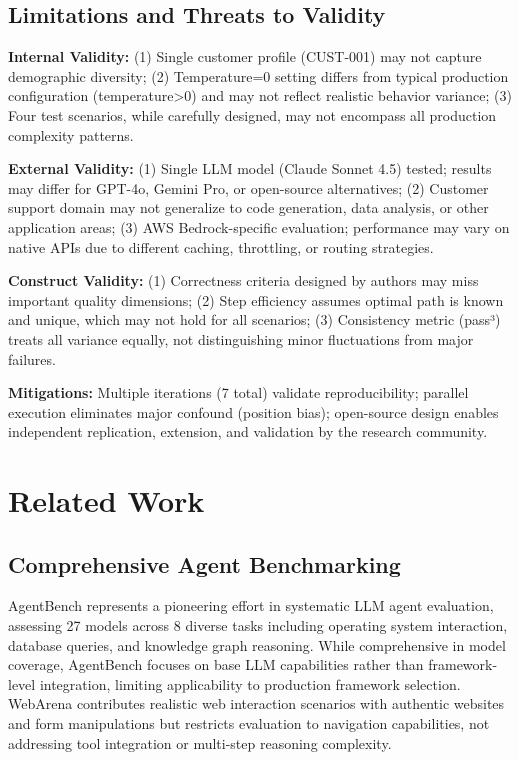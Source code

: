 \documentclass[sigconf,nonacm]{acmart}
\begin{document}
\subsection{Limitations and Threats to Validity}

\textbf{Internal Validity:} (1) Single customer profile (CUST-001) may not capture demographic diversity; (2) Temperature=0 setting differs from typical production configuration (temperature>0) and may not reflect realistic behavior variance; (3) Four test scenarios, while carefully designed, may not encompass all production complexity patterns.

\textbf{External Validity:} (1) Single LLM model (Claude Sonnet 4.5) tested; results may differ for GPT-4o, Gemini Pro, or open-source alternatives; (2) Customer support domain may not generalize to code generation, data analysis, or other application areas; (3) AWS Bedrock-specific evaluation; performance may vary on native APIs due to different caching, throttling, or routing strategies.

\textbf{Construct Validity:} (1) Correctness criteria designed by authors may miss important quality dimensions; (2) Step efficiency assumes optimal path is known and unique, which may not hold for all scenarios; (3) Consistency metric (pass³) treats all variance equally, not distinguishing minor fluctuations from major failures.

\textbf{Mitigations:} Multiple iterations (7 total) validate reproducibility; parallel execution eliminates major confound (position bias); open-source design enables independent replication, extension, and validation by the research community.

\section{Related Work}

\subsection{Comprehensive Agent Benchmarking}

AgentBench \cite{liu2023agentbench} represents a pioneering effort in systematic LLM agent evaluation, assessing 27 models across 8 diverse tasks including operating system interaction, database queries, and knowledge graph reasoning. While comprehensive in model coverage, AgentBench focuses on base LLM capabilities rather than framework-level integration, limiting applicability to production framework selection. WebArena \cite{zhou2023webarena} contributes realistic web interaction scenarios with authentic websites and form manipulations but restricts evaluation to navigation capabilities, not addressing tool integration or multi-step reasoning complexity.
\end{document}
